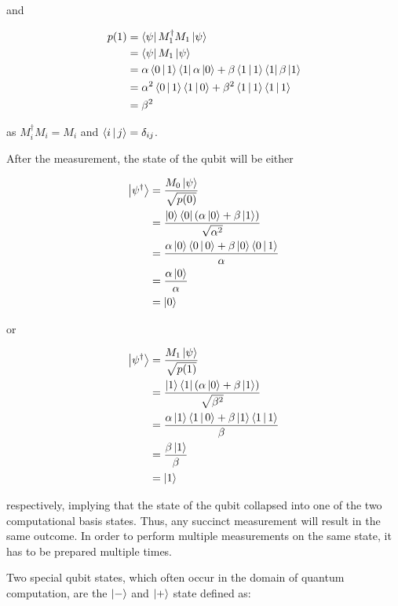 and

\begin{align}
  p(1) &= \Bra{\psi} M_1^{\dagger} M_1 \Ket{\psi} \\
       &= \Bra{\psi} M_1 \Ket{\psi} \\
       &= \alpha \Braket{0|1} \Bra{1} \alpha \Ket{0} + \beta \Braket{1|1} \Bra{1} \beta \Ket{1} \\
       &= \alpha^2 \Braket{0|1} \Braket{1|0} + \beta^2 \Braket{1|1} \Braket{1|1} \\
       &= \beta^2
\end{align}

as $M_i^{\dagger}M_i = M_i$ and $\Braket{i|j} = \delta_{ij}$.

After the measurement, the state of the qubit will be either

\begin{align}
  \Ket{\psi^{\dagger}} &= \frac{M_0 \Ket{\psi}}{\sqrt{p(0)}} \\
                       &= \frac{\Ket{0}\Bra{0}\left(\alpha \Ket{0} + \beta \Ket{1}\right)}{\sqrt{\alpha^2}} \\
                       &= \frac{\alpha \Ket{0}\Braket{0 | 0} + \beta \Ket{0} \Braket{ 0 | 1} }{\alpha} \\
                       &= \frac{\alpha \Ket{0}}{\alpha} \\
                       &= \Ket{0}
\end{align}

or

\begin{align}
  \Ket{\psi^{\dagger}} &= \frac{M_1 \Ket{\psi}}{\sqrt{p(1)}} \\
                       &= \frac{\Ket{1}\Bra{1}\left(\alpha \Ket{0} + \beta \Ket{1}\right)}{\sqrt{\beta^2}} \\
                       &= \frac{\alpha \Ket{1}\Braket{1 | 0} + \beta \Ket{1} \Braket{ 1 | 1} }{\beta} \\
                       &= \frac{\beta \Ket{1}}{\beta} \\
                       &= \Ket{1}
\end{align}

respectively, implying that the state of the qubit collapsed into one of the two computational
basis states. Thus, any succinct measurement will result in the same outcome.
In order to perform multiple measurements on the same state, it has to be prepared multiple times.

Two special qubit states, which often occur in the domain of quantum computation, are the $\Ket{-}$ and $\Ket{+}$ state defined as:

